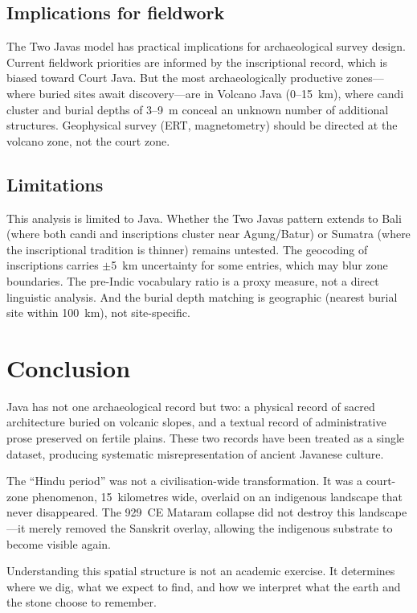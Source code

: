 \documentclass[12pt]{article}
\begin{document}
\subsection{Implications for fieldwork}

The Two Javas model has practical implications for archaeological survey design.
Current fieldwork priorities are informed by the inscriptional record, which is biased toward Court Java.
But the most archaeologically productive zones---where buried sites await discovery---are in Volcano Java (0--15~km), where candi cluster and burial depths of 3--9~m conceal an unknown number of additional structures.
Geophysical survey (ERT, magnetometry) should be directed at the volcano zone, not the court zone.

\subsection{Limitations}

This analysis is limited to Java.
Whether the Two Javas pattern extends to Bali (where both candi and inscriptions cluster near Agung/Batur) or Sumatra (where the inscriptional tradition is thinner) remains untested.
The geocoding of inscriptions carries $\pm$5~km uncertainty for some entries, which may blur zone boundaries.
The pre-Indic vocabulary ratio is a proxy measure, not a direct linguistic analysis.
And the burial depth matching is geographic (nearest burial site within 100~km), not site-specific.


\section{Conclusion}

Java has not one archaeological record but two: a physical record of sacred architecture buried on volcanic slopes, and a textual record of administrative prose preserved on fertile plains.
These two records have been treated as a single dataset, producing systematic misrepresentation of ancient Javanese culture.

The ``Hindu period'' was not a civilisation-wide transformation.
It was a court-zone phenomenon, 15~kilometres wide, overlaid on an indigenous landscape that never disappeared.
The 929~CE Mataram collapse did not destroy this landscape---it merely removed the Sanskrit overlay, allowing the indigenous substrate to become visible again.

Understanding this spatial structure is not an academic exercise.
It determines where we dig, what we expect to find, and how we interpret what the earth and the stone choose to remember.
\end{document}
